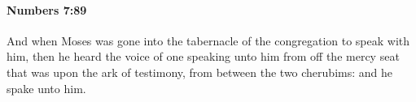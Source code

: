 
		\paragraph{Numbers 7:89} %
			\label{NUMBERS-7-89}

			And when Moses was gone into the tabernacle of the congregation to speak with him, then he heard the voice of one speaking unto him from off the mercy seat that was upon the ark of testimony, from between the two cherubims: and he spake unto him.

